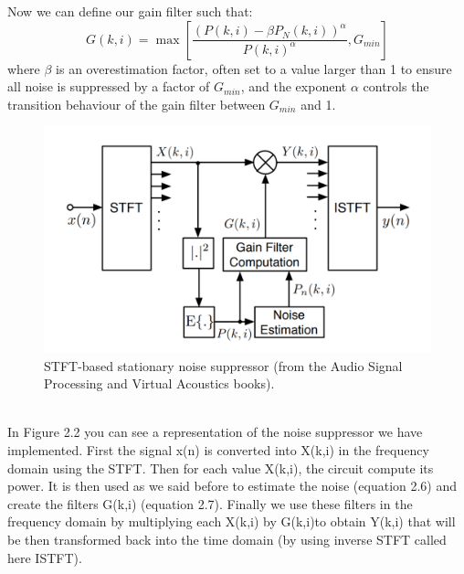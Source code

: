\documentclass[11pt,a4paper,titlepage]{report}
\begin{document}
Now we can define our gain filter such that:
\begin{equation}
G(k,i) = \max[\frac{(P(k,i)- \beta P_{N}(k,i))^\alpha}{P(k,i)^\alpha}, G_{min}]
\end{equation}
where $\beta$ is an overestimation factor, often set to a value larger than 1 to ensure all noise is suppressed by a factor of $G_{min}$, and the exponent $\alpha$ controls the transition behaviour of the gain filter between $G_{min}$ and 1.
\begin{figure}[h!]
	\centering
	\includegraphics[width=0.7\linewidth]{rapport4}
	\caption{STFT-based stationary noise suppressor (from the Audio Signal Processing and Virtual Acoustics books).}
	\label{fig:rapport4}
\end{figure}\\
\hspace*{0.6cm}
In Figure 2.2 you can see a representation of the noise suppressor we have implemented. First the signal x(n) is converted into X(k,i) in the frequency domain using the STFT. Then for each value X(k,i), the circuit compute its power. It is then used as we said before to estimate the noise (equation 2.6) and create the filters G(k,i) (equation 2.7). Finally we use these filters in the frequency domain by multiplying each X(k,i) by G(k,i)to obtain Y(k,i) that will be then transformed back into the time domain (by using inverse STFT called here ISTFT).
\end{document}
